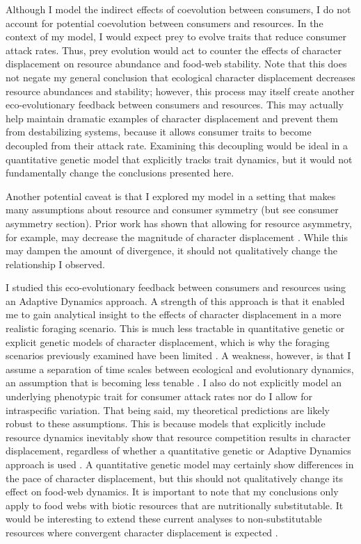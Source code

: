 \documentclass[11pt,]{article}
\begin{document}
Although I model the indirect effects of coevolution between consumers,
I do not account for potential coevolution between consumers and
resources. In the context of my model, I would expect prey to evolve
traits that reduce consumer attack rates. Thus, prey evolution would act
to counter the effects of character displacement on resource abundance
and food-web stability. Note that this does not negate my general
conclusion that ecological character displacement decreases resource
abundances and stability; however, this process may itself create
another eco-evolutionary feedback between consumers and resources. This
may actually help maintain dramatic examples of character displacement
and prevent them from destabilizing systems, because it allows consumer
traits to become decoupled from their attack rate. Examining this
decoupling would be ideal in a quantitative genetic model that
explicitly tracks trait dynamics, but it would not fundamentally change
the conclusions presented here.

Another potential caveat is that I explored my model in a setting that
makes many assumptions about resource and consumer symmetry (but see
consumer asymmetry section). Prior work has shown that allowing for
resource asymmetry, for example, may decrease the magnitude of character
displacement \citep{Abrams1986}. While this may dampen the amount of
divergence, it should not qualitatively change the relationship I
observed.

I studied this eco-evolutionary feedback between consumers and resources
using an Adaptive Dynamics approach. A strength of this approach is that
it enabled me to gain analytical insight to the effects of character
displacement in a more realistic foraging scenario. This is much less
tractable in quantitative genetic \citep{Taper1985, McPeek2017} or
explicit genetic \citep{Doebeli1996} models of character displacement,
which is why the foraging scenarios previously examined have been
limited \citep[but see][]{McPeek2017}. A weakness, however, is that I
assume a separation of time scales between ecological and evolutionary
dynamics, an assumption that is becoming less tenable
\citep{Hairston2005, Hendry2016}. I also do not explicitly model an
underlying phenotypic trait for consumer attack rates nor do I allow for
intraspecific variation. That being said, my theoretical predictions are
likely robust to these assumptions. This is because models that
explicitly include resource dynamics inevitably show that resource
competition results in character displacement, regardless of whether a
quantitative genetic or Adaptive Dynamics approach is used
\citep{Lawlor1976, Taper1985}. A quantitative genetic model may
certainly show differences in the pace of character displacement, but
this should not qualitatively change its effect on food-web dynamics. It
is important to note that my conclusions only apply to food webs with
biotic resources that are nutritionally substitutable. It would be
interesting to extend these current analyses to non-substitutable
resources where convergent character displacement is expected
\citep{Abrams1987, Fox2008}.
\end{document}

